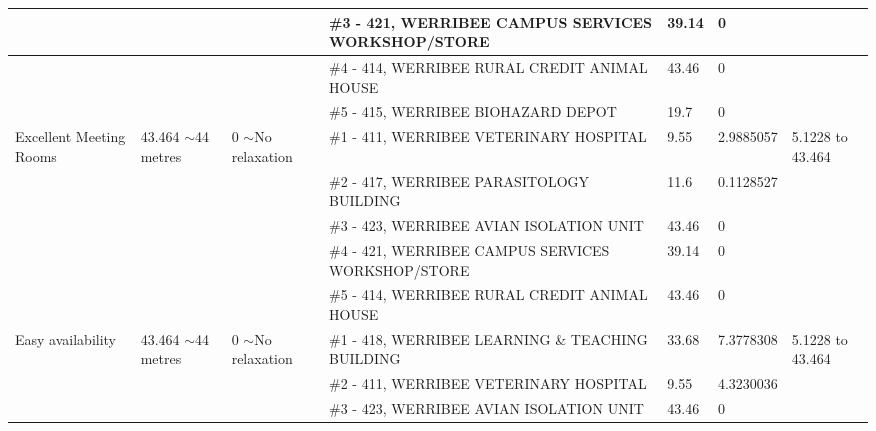 \begin{table}[H]
{\begin{tabular}{|l|l|l|l|l|l|l|}
                        &                          &                          & \#3 - 421, WERRIBEE CAMPUS SERVICES WORKSHOP/STORE & 39.14         & 0               &                           \\ \hline
                        &                          &                          & \#4 - 414, WERRIBEE RURAL CREDIT ANIMAL HOUSE      & 43.46         & 0               &                           \\ \hline
                        &                          &                          & \#5 - 415, WERRIBEE BIOHAZARD DEPOT                & 19.7          & 0               &                           \\ \hline
Excellent Meeting Rooms & 43.464 $\sim$44 metres   & 0 $\sim$No relaxation    & \#1 - 411, WERRIBEE VETERINARY HOSPITAL            & 9.55          & 2.9885057       & 5.1228 to 43.464          \\ \hline
                        &                          &                          & \#2 - 417, WERRIBEE PARASITOLOGY BUILDING          & 11.6          & 0.1128527       &                           \\ \hline
                        &                          &                          & \#3 - 423, WERRIBEE AVIAN ISOLATION UNIT           & 43.46         & 0               &                           \\ \hline
                        &                          &                          & \#4 - 421, WERRIBEE CAMPUS SERVICES WORKSHOP/STORE & 39.14         & 0               &                           \\ \hline
                        &                          &                          & \#5 - 414, WERRIBEE RURAL CREDIT ANIMAL HOUSE      & 43.46         & 0               &                           \\ \hline
Easy availability       & 43.464 $\sim$44 metres   & 0 $\sim$No relaxation    & \#1 - 418, WERRIBEE LEARNING \& TEACHING BUILDING  & 33.68         & 7.3778308       & 5.1228 to 43.464          \\ \hline
                        &                          &                          & \#2 - 411, WERRIBEE VETERINARY HOSPITAL            & 9.55          & 4.3230036       &                           \\ \hline
                        &                          &                          & \#3 - 423, WERRIBEE AVIAN ISOLATION UNIT           & 43.46         & 0               &                           \\ \hline

\end{tabular}}
\end{table}
